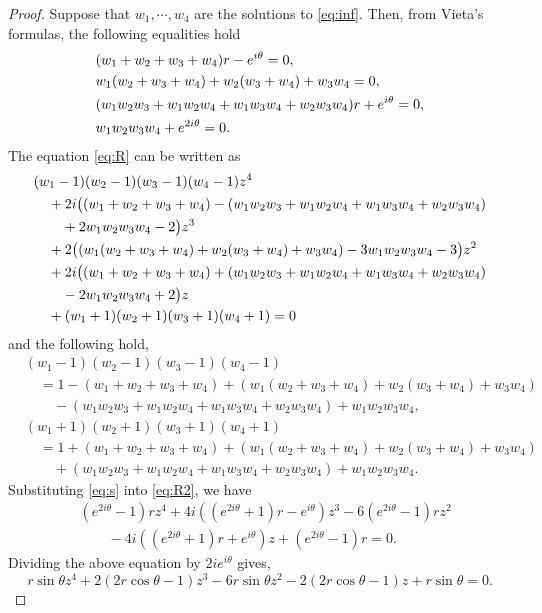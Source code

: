 \documentclass[12pt,a4paper]{amsart}
\theoremstyle{plain}
\theoremstyle{definition}
\theoremstyle{remark}
\numberwithin{equation}{section}
\begin{document}
\begin{proof}
Suppose that $ w_1,\cdots,w_4 $ are the solutions to \eqref{eq:inf}.
Then, from Vieta's formulas, the following equalities hold
\begin{align} \notag
  &  (w_1+w_2+w_3+w_4)r-e^{i\theta}=0,\\  \notag
  &  w_1(w_2+w_3+w_4)+w_2(w_3+w_4)+w_3w_4=0, \\ \notag
  &  (w_1w_2w_3+w_1w_2w_4+w_1w_3w_4+w_2w_3w_4)r+e^{i\theta}=0, \\ \label{eq:s}
  & w_1w_2w_3w_4+e^{2i\theta}=0.
\end{align}
The equation \eqref{eq:R} can be written as 
\begin{align}\notag
  &(w_1-1)(w_2-1)(w_3-1)(w_4-1)z^4 \\ \notag
  & \quad +2i\big((w_1+w_2+w_3+w_4)-(w_1w_2w_3+w_1w_2w_4+w_1w_3w_4+w_2w_3w_4)\\
     \notag
  & \qquad
        +2w_1w_2w_3w_4-2\big)z^3 \\ \notag
  & \quad +2\big((w_1(w_2+w_3+w_4)+w_2(w_3+w_4)+w_3w_4)-3w_1w_2w_3w_4-3\big)z^2 \\
       \notag
  & \quad +2i\big((w_1+w_2+w_3+w_4)+(w_1w_2w_3+w_1w_2w_4+w_1w_3w_4+w_2w_3w_4)\\
    \notag
  & \qquad
           -2w_1w_2w_3w_4+2\big)z \\  \label{eq:R2}
  & \quad +(w_1+1)(w_2+1)(w_3+1)(w_4+1)=0
\end{align}
and the following hold,
\begin{align*}
 & (w_1-1)(w_2-1)(w_3-1)(w_4-1) \\
 & \quad =1-(w_1+w_2+w_3+w_4)
    +(w_1(w_2+w_3+w_4)+w_2(w_3+w_4)+w_3w_4) \\
 & \qquad   -(w_1w_2w_3+w_1w_2w_4+w_1w_3w_4+w_2w_3w_4)+w_1w_2w_3w_4, \\
 & (w_1+1)(w_2+1)(w_3+1)(w_4+1) \\ 
 & \quad  =1+(w_1+w_2+w_3+w_4)
      +(w_1(w_2+w_3+w_4)+w_2(w_3+w_4)+w_3w_4) \\
 & \qquad   +(w_1w_2w_3+w_1w_2w_4+w_1w_3w_4+w_2w_3w_4)+w_1w_2w_3w_4.
\end{align*}
Substituting \eqref{eq:s} into \eqref{eq:R2}, we have
\begin{align*}
  & (e^{2i\theta}-1)rz^4+4i((e^{2i\theta}+1)r-e^{i\theta})z^3-6(e^{2i\theta}-1)rz^2 \\
  & \qquad
     -4i((e^{2i\theta}+1)r+e^{i\theta})z +(e^{2i\theta}-1)r=0.
\end{align*}
Dividing the above equation by $ 2ie^{i\theta} $ gives,
\begin{equation}\label{eq:R3}
  r\sin \theta z^4+2(2r\cos \theta -1)z^3-6r\sin \theta z^2
    -2(2r\cos\theta -1)z+r\sin\theta =0.
\end{equation}


\end{proof}
\end{document}
